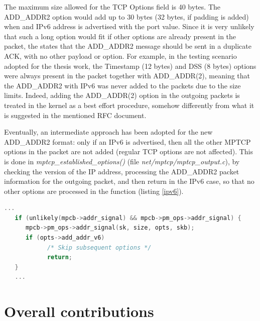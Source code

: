 The maximum size allowed for the TCP Options field is 40 bytes. The ADD\_ADDR2 option would add up to 30 bytes (32 bytes, if padding is added) when and IPv6 address is advertised with the port value.  Since it is very unlikely that such a long option would fit if other options are already present in the packet, the  states that the ADD\_ADDR2 message should be sent in a duplicate ACK, with no other payload or option. 
For example, in the testing scenario adopted for the thesis work, the Timestamp (12 bytes) and DSS (8 bytes) options were always present in the packet together with ADD\_ADDR(2), meaning that the ADD\_ADDR2 with IPv6 was never added to the packets due to the size limits. Indeed, adding the ADD\_ADDR(2) option in the outgoing packets is treated in the kernel as a best effort procedure, somehow differently from what it is suggested in the mentioned RFC document.

Eventually, an intermediate approach has been adopted for the new ADD\_ADDR2 format: only if an IPv6 is advertised, then all the other MPTCP options in the packet are not added (regular TCP options are not affected). This is done in \textit{mptcp\_established\_options()} (file \textit{ net/mptcp/mptcp\_output.c}), by checking the version of the IP address, processing the ADD\_ADDR2 packet information for the outgoing packet, and then return in the IPv6 case, so that no other options are processed in the function (listing \ref{ipv6}).

\begin{lstlisting}[language=c, caption=\textit{In IPv6 case, MPTCP options are not added if ADD\_ADDR2 is present}, label=ipv6]
   ...
   if (unlikely(mpcb->addr_signal) && mpcb->pm_ops->addr_signal) {
      mpcb->pm_ops->addr_signal(sk, size, opts, skb);
      if (opts->add_addr_v6)
            /* Skip subsequent options */
            return;
   }
   ...
\end{lstlisting}


\section{Overall contributions}
\label{otherc}

